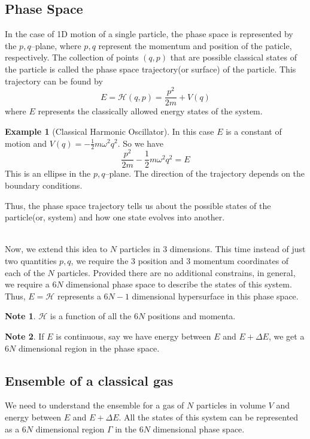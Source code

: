 \documentclass[10pt, a4paper]{extarticle}
\theoremstyle{definition}
\newtheorem{eg}{Example}
\newtheorem*{note*}{Note}
\begin{document}
\subsection{Phase Space}
In the case of 1D motion of a single particle, the phase space is represented by the $p,q$--plane, where $p,q$ represent the momentum and position of the paticle, respectively. The collection of points $(q,p)$ that are possible classical states of the particle is called the phase space trajectory(or surface) of the particle. This trajectory can be found by
\[E=\mathcal{H}(q,p)=\frac{p^2}{2m}+V(q)\]
where $E$ represents the classically allowed energy states of the system.
\begin{eg}[Classical Harmonic Oscillator]
	In this case $E$ is a constant of motion and $V(q)=-\frac{1}{2}m\omega^2q^2$. So we have
	\[\frac{p^2}{2m}-\frac{1}{2}m\omega^2q^2=E\]
	This is an ellipse in the $p,q$--plane. The direction of the trajectory depends on the boundary conditions.
\end{eg}
\begin{framed}
	Thus, the phase space trajectory tells us about the possible states of the particle(or, system) and how one state evolves into another.
\end{framed}
\hfill\\
Now, we extend this idea to $N$ particles in 3 dimensions. This time instead of just two quantities $p,q$, we require the 3 position and 3 momentum coordinates of each of the $N$ particles. Provided there are no additional constrains, in general, we require a $6N$ dimensional phase space to describe the states of this system. Thus, $E=\mathcal{H}$ represents a $6N-1$ dimensional hypersurface in this phase space.
\begin{note*}
	$\mathcal{H}$ is a function of all the $6N$ positions and momenta.
\end{note*}
\begin{note*}
	If $E$ is continuous, say we have energy between $E$ and $E+\Delta E$, we get a $6N$ dimensional region in the phase space.
\end{note*}

\subsection{Ensemble of a classical gas}
We need to understand the ensemble for a gas of $N$ particles in volume $V$ and energy between $E$ and $E+\Delta E$.
All the states of this system can be represented as a $6N$ dimensional region $\Gamma$ in the $6N$ dimensional phase space.
\end{document}
